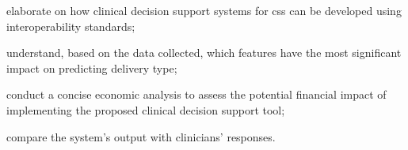 \begin{myitemize}
    \item elaborate on how clinical decision support systems for \acp{cs} can be developed using interoperability standards;
    \item understand, based on the data collected, which features have the most significant impact on predicting delivery type;
    \item conduct a concise economic analysis to assess the potential financial impact of implementing the proposed clinical decision support tool;
    \item  compare the system's output with clinicians' responses.

\end{myitemize}